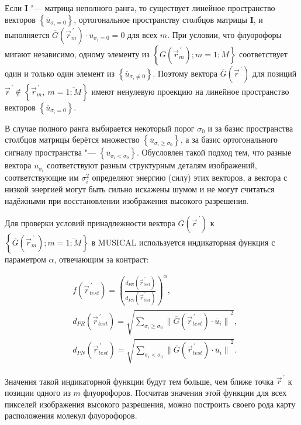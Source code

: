 Если $\mathbf{I}$ "--- матрица неполного ранга, то существует линейное пространство векторов $\left\{{\overline{u}}_{\sigma_i=0}\right\}$, ортогональное пространству столбцов матрицы $\mathbf{I}$, и выполняется $\overline{G}\left({\vec{r}}_m^{\,\prime}\right) \cdot {\overline{u}}_{\sigma_i=0}=0$ для всех $m$. При условии, что флуорофоры мигают независимо, одному элементу из $\left\{\overline{G}\left({\vec{r}}_m^{\,\prime}\right); m=\overline{1;M}\right\}$ соответствует один и только один элемент из $\left\{{\overline{u}}_{\sigma_i\neq0}\right\}$. Поэтому вектора $\overline{G}\left({\vec{r}}^{\,\prime}\right)$ для позиций ${\vec{r}}^{\,\prime} \notin \left\{{\vec{r}}_m^{\,\prime},\ m=\overline{1;M}\right\}$ имеют ненулевую проекцию на линейное пространство векторов $\left\{{\overline{u}}_{\sigma_i=0}\right\}$.

В случае полного ранга выбирается некоторый порог $\sigma_0$ и за базис пространства столбцов матрицы берётся множество $\left\{{\overline{u}}_{\sigma_i\geq\sigma_0}\right\}$, а за базис ортогонального сигналу пространства "--- $\left\{{\overline{u}}_{\sigma_i<\sigma_0}\right\}$. Обусловлен такой подход тем, что разные вектора ${\overline{u}}_{\sigma_i}$ соответствуют разным структурным деталям изображений, соответствующие им $\sigma_i^2$ определяют энергию (силу) этих векторов, а вектора с низкой энергией могут быть сильно искажены шумом и не могут считаться надёжными при восстановлении изображения высокого разрешения.

Для проверки условий принадлежности вектора $\overline{G}\left({\vec{r}}^{\,\prime}\right)$ к $\left\{\overline{G}\left({\vec{r}}_m^{\,\prime}\right); m=\overline{1;M}\right\}$ в MUSICAL используется индикаторная функция с параметром $\alpha$, отвечающим за контраст:

\begin{align*}
	&f\left({\vec{r}}_{test}^{\,\prime}\right) = \left(\frac{d_{PR}\left({\vec{r}}_{test}^{\,\prime}\right)} {d_{PN}\left({\vec{r}}_{test}^{\,\prime}\right)}\right)^\alpha, \\
	&d_{PR}\left({\vec{r}}_{test}^{\,\prime}\right) = \sqrt{\sum_{\sigma_i\geq\sigma_0}{\lVert \overline{G}\left({\vec{r}}_{test}^{\,\prime}\right)\cdot{\overline{u}}_i \rVert}^2}, \\
	&d_{PN}\left({\vec{r}}_{test}^{\,\prime}\right) = \sqrt{\sum_{\sigma_i<\sigma_0}{\lVert \overline{G}\left({\vec{r}}_{test}^{\,\prime}\right)\cdot{\overline{u}}_i \rVert}^2}.
\end{align*}

Значения такой индикаторной функции будут тем больше, чем ближе точка ${\vec{r}}^{\,\prime}$ к позиции одного из $m$ флуорофоров. Посчитав значения этой функции для всех пикселей изображения высокого разрешения, можно построить своего рода карту расположения молекул флуорофоров.

